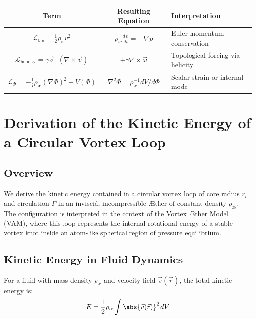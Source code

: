\documentclass[12pt]{article}
\begin{document}
\begin{center}
    \begin{tabular}{|c|c|l|}
        \hline
        Term & Resulting Equation & Interpretation \\
        \hline
        $ \mathcal{L}_{\text{kin}} = \frac{1}{2} \rho_\text{\ae} v^2 $ & $ \rho_\text{\ae} \frac{d \vec{v}}{dt} = -\nabla p $ & Euler momentum conservation \\
        $ \mathcal{L}_{\text{helicity}} = \gamma \vec{v} \cdot (\nabla \times \vec{v}) $ & $ +\gamma \nabla \times \vec{\omega} $ & Topological forcing via helicity \\
        $ \mathcal{L}_\Phi = -\frac{1}{2} \rho_\text{\ae} (\nabla \Phi)^2 - V(\Phi) $ & $ \nabla^2 \Phi = \rho_\text{\ae}^{-1} dV/d\Phi $ & Scalar strain or internal mode \\
        \hline
    \end{tabular}
\end{center}



\section{Derivation of the Kinetic Energy of a Circular Vortex Loop}\label{sec:derivation-of-the-kinetic-energy-of-a-circular-vortex-loop}

\subsection{Overview}
We derive the kinetic energy contained in a circular vortex loop of core radius $r_c$ and circulation $\Gamma$ in an inviscid, incompressible Æther of constant density $\rho_\text{\ae}$. The configuration is interpreted in the context of the Vortex Æther Model (VAM), where this loop represents the internal rotational energy of a stable vortex knot inside an atom-like spherical region of pressure equilibrium.

\subsection{Kinetic Energy in Fluid Dynamics}
For a fluid with mass density $\rho_\text{\ae}$ and velocity field $\vec{v}(\vec{r})$, the total kinetic energy is:
\begin{equation}
    E = \frac{1}{2} \rho_\text{\ae} \int \abs{\vec{v}(\vec{r})}^2 \, dV
\end{equation}
\end{document}
